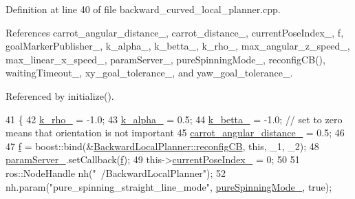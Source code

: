 Definition at line 40 of file backward\+\_\+curved\+\_\+local\+\_\+planner.\+cpp.



References carrot\+\_\+angular\+\_\+distance\+\_\+, carrot\+\_\+distance\+\_\+, current\+Pose\+Index\+\_\+, f, goal\+Marker\+Publisher\+\_\+, k\+\_\+alpha\+\_\+, k\+\_\+betta\+\_\+, k\+\_\+rho\+\_\+, max\+\_\+angular\+\_\+z\+\_\+speed\+\_\+, max\+\_\+linear\+\_\+x\+\_\+speed\+\_\+, param\+Server\+\_\+, pure\+Spinning\+Mode\+\_\+, reconfig\+C\+B(), waiting\+Timeout\+\_\+, xy\+\_\+goal\+\_\+tolerance\+\_\+, and yaw\+\_\+goal\+\_\+tolerance\+\_\+.



Referenced by initialize().


\begin{DoxyCode}
41 \{
42     \hyperlink{classmove__base__z__client_1_1backward__local__planner_1_1BackwardLocalPlanner_a9ae9a8c4c4663a999ba107aea9f6868d}{k\_rho\_} = -1.0;
43     \hyperlink{classmove__base__z__client_1_1backward__local__planner_1_1BackwardLocalPlanner_ac859500c0329247de08daf864fd2d4b1}{k\_alpha\_} = 0.5;
44     \hyperlink{classmove__base__z__client_1_1backward__local__planner_1_1BackwardLocalPlanner_aa2f7fe022cdc4eb11c17f6f576c732c6}{k\_betta\_} = -1.0; \textcolor{comment}{// set to zero means that orientation is not important}
45     \hyperlink{classmove__base__z__client_1_1backward__local__planner_1_1BackwardLocalPlanner_a3d6cba0748b85a67f5dfd7740de9530f}{carrot\_angular\_distance\_} = 0.5;
46 
47     \hyperlink{classmove__base__z__client_1_1backward__local__planner_1_1BackwardLocalPlanner_a8851653bff38ab410bda8aca0ba32574}{f} = boost::bind(&\hyperlink{classmove__base__z__client_1_1backward__local__planner_1_1BackwardLocalPlanner_a9dfe3fd3fd7a0c8ec414a78e1300d09c}{BackwardLocalPlanner::reconfigCB}, \textcolor{keyword}{this}, \_1, \_2);
48     \hyperlink{classmove__base__z__client_1_1backward__local__planner_1_1BackwardLocalPlanner_ab4e01416e0e6d79c00daaf7b2b9aae78}{paramServer\_}.setCallback(\hyperlink{classmove__base__z__client_1_1backward__local__planner_1_1BackwardLocalPlanner_a8851653bff38ab410bda8aca0ba32574}{f});
49     this->\hyperlink{classmove__base__z__client_1_1backward__local__planner_1_1BackwardLocalPlanner_af304b2e7cde744ad905a1ae7889102b6}{currentPoseIndex\_} = 0;
50 
51     ros::NodeHandle nh(\textcolor{stringliteral}{"~/BackwardLocalPlanner"});
52     nh.param(\textcolor{stringliteral}{"pure\_spinning\_straight\_line\_mode"}, \hyperlink{classmove__base__z__client_1_1backward__local__planner_1_1BackwardLocalPlanner_abf2b84c0d7a841a7fcec1b93bf5fdd0e}{pureSpinningMode\_}, \textcolor{keyword}{true});

\end{DoxyCode}
